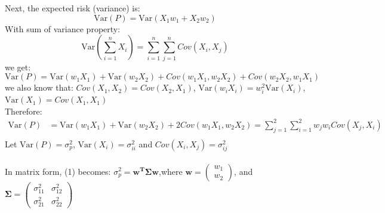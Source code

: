 \documentclass[12pt,titlepage,letter]{article}
\begin{document}
			Next, the expected risk (variance) is: 
			$$
				\mathrm{Var}(P) = \mathrm{Var}(X_1w_1 + X_2w_2)
			$$
			With sum of variance property: $$\mathrm{Var}(\sum_{i=1}^{n}{X_i}) = \sum_{i=1}^n\sum_{j=1}^{n}{Cov(X_i,X_j)}$$
			we get: 
			$$
				\mathrm{Var}(P) = \mathrm{Var}(w_1X_1)+\mathrm{Var}(w_2X_2)+Cov(w_1X_1,w_2X_2)+Cov(w_2X_2,w_1X_1)
			$$
			we also know that: $Cov(X_1,X_2) = Cov(X_2,X_1)$, $\mathrm{Var}(w_iX_i)=w_i^2\mathrm{Var}(X_i)$, $\mathrm{Var}(X_1)=Cov(X_1,X_1)$ \\
			Therefore: 
			\begin{equation}
				\begin{split}
				\mathrm{Var}(P) &= \mathrm{Var}(w_1X_1)+\mathrm{Var}(w_2X_2)+2Cov(w_1X_1,w_2X_2) = \sum_{j=1}^2{{\sum_{i=1}^2w_jw_iCov(X_j,X_i)}}\\
				\end{split}
			\end{equation}
			Let $\mathrm{Var}(P)=\sigma_p^2$, $\mathrm{Var}(X_i)=\sigma_{ii}^2$ and $Cov(X_i,X_j)=\sigma_{ij}^2$ \\ \\
			In matrix form, (1) becomes: $\sigma_p^2 = \mathbf{w^T\Sigma w}$,where $\mathbf{w} = \begin{pmatrix} w_1 \\ w_2 \end{pmatrix}$, and $\mathbf{\Sigma} = \begin{pmatrix}\sigma_{11}^2 & \sigma_{12}^2 \\ \sigma_{21}^2 & \sigma_{22}^2 \end{pmatrix}$ \\ \\
\end{document}
